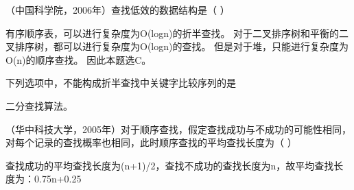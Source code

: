 \question （中国科学院，2006年）查找低效的数据结构是（ ）
\par{}
\begin{solution}有序顺序表，可以进行复杂度为O(logn)的折半查找。
对于二叉排序树和平衡的二叉排序树，都可以进行复杂度为O(logn)的查找。
但是对于堆，只能进行复杂度为O(n)的顺序查找。 因此本题选C。
\end{solution}
\question 下列选项中，不能构成折半查找中关键字比较序列的是
\par{}
\begin{solution}二分查找算法。
\end{solution}
\question （华中科技大学，2005年）对于顺序查找，假定查找成功与不成功的可能性相同，对每个记录的查找概率也相同，此时顺序查找的平均查找长度为（
）
\par{}
\begin{solution}查找成功的平均查找长度为(n+1)/2，查找不成功的查找长度为n，故平均查找长度为：0.75n+0.25
\end{solution}
